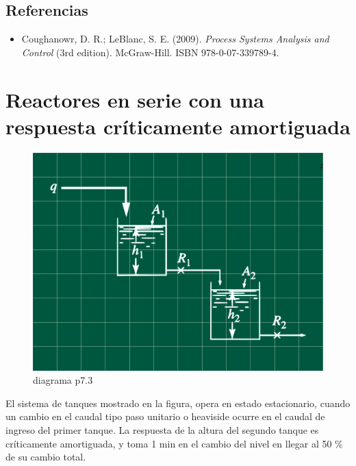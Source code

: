 \documentclass[
  letterpaper,
  DIV=11,
  numbers=noendperiod]{scrreprt}
\providecommand{\tightlist}{%
  \setlength{\itemsep}{0pt}\setlength{\parskip}{0pt}}\usepackage{longtable,booktabs,array}
\begin{document}
\hypertarget{referencias-11}{%
\section{Referencias}\label{referencias-11}}

\begin{itemize}
\tightlist
\item
  Coughanowr, D. R.; LeBlanc, S. E. (2009). \emph{Process Systems
  Analysis and Control} (3rd edition). McGraw-Hill. ISBN
  978-0-07-339789-4.
\end{itemize}

\hypertarget{reactores-en-serie-con-una-respuesta-cruxedticamente-amortiguada}{%
\chapter{Reactores en serie con una respuesta críticamente
amortiguada}\label{reactores-en-serie-con-una-respuesta-cruxedticamente-amortiguada}}

\begin{figure}

{\centering \includegraphics{././images/p7.3-coughanowr/headercontrol73.png}

}

\caption{diagrama p7.3}

\end{figure}

El sistema de tanques mostrado en la figura, opera en estado
estacionario, cuando un cambio en el caudal tipo paso unitario o
heaviside ocurre en el caudal de ingreso del primer tanque. La respuesta
de la altura del segundo tanque es críticamente amortiguada, y toma 1
min en el cambio del nivel en llegar al 50 \% de su cambio total.
\end{document}
